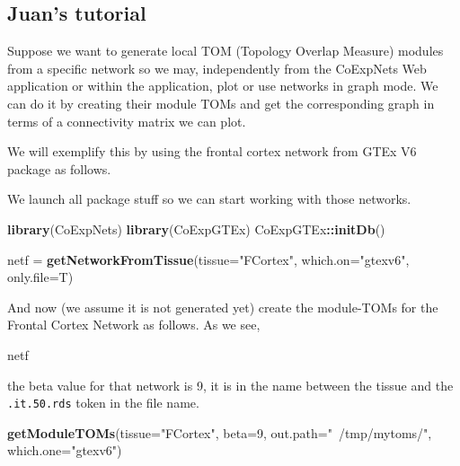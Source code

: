 \documentclass[]{book}
\newenvironment{Shaded}{\begin{snugshade}}{\end{snugshade}}
\newcommand{\KeywordTok}[1]{\textcolor[rgb]{0.13,0.29,0.53}{\textbf{#1}}}
\newcommand{\DataTypeTok}[1]{\textcolor[rgb]{0.13,0.29,0.53}{#1}}
\newcommand{\DecValTok}[1]{\textcolor[rgb]{0.00,0.00,0.81}{#1}}
\newcommand{\StringTok}[1]{\textcolor[rgb]{0.31,0.60,0.02}{#1}}
\newcommand{\OperatorTok}[1]{\textcolor[rgb]{0.81,0.36,0.00}{\textbf{#1}}}
\newcommand{\NormalTok}[1]{#1}
\begin{document}
\subsection{Juan's tutorial}\label{juans-tutorial}

Suppose we want to generate local TOM (Topology Overlap Measure) modules
from a specific network so we may, independently from the CoExpNets Web
application or within the application, plot or use networks in graph
mode. We can do it by creating their module TOMs and get the
corresponding graph in terms of a connectivity matrix we can plot.

We will exemplify this by using the frontal cortex network from GTEx V6
package as follows.

We launch all package stuff so we can start working with those networks.

\begin{Shaded}
\begin{Highlighting}[]
\KeywordTok{library}\NormalTok{(CoExpNets)}
\KeywordTok{library}\NormalTok{(CoExpGTEx)}
\NormalTok{CoExpGTEx}\OperatorTok{::}\KeywordTok{initDb}\NormalTok{()}

\NormalTok{netf =}\StringTok{ }\KeywordTok{getNetworkFromTissue}\NormalTok{(}\DataTypeTok{tissue=}\StringTok{"FCortex"}\NormalTok{,}
                            \DataTypeTok{which.on=}\StringTok{"gtexv6"}\NormalTok{,}
                            \DataTypeTok{only.file=}\NormalTok{T)}
\end{Highlighting}
\end{Shaded}

And now (we assume it is not generated yet) create the module-TOMs for
the Frontal Cortex Network as follows. As we see,

\begin{Shaded}
\begin{Highlighting}[]
\NormalTok{netf}
\end{Highlighting}
\end{Shaded}

the beta value for that network is 9, it is in the name between the
tissue and the \texttt{.it.50.rds} token in the file name.

\begin{Shaded}
\begin{Highlighting}[]
\KeywordTok{getModuleTOMs}\NormalTok{(}\DataTypeTok{tissue=}\StringTok{"FCortex"}\NormalTok{,}
              \DataTypeTok{beta=}\DecValTok{9}\NormalTok{,}
              \DataTypeTok{out.path=}\StringTok{"~/tmp/mytoms/"}\NormalTok{,}
              \DataTypeTok{which.one=}\StringTok{"gtexv6"}\NormalTok{)}
\end{Highlighting}
\end{Shaded}
\end{document}
